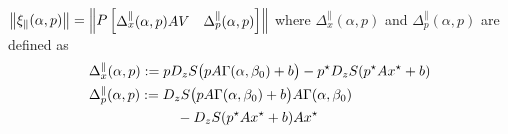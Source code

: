 \documentclass[letterpaper, 10 pt, conference]{ieeeconf}
\begin{document}
\begin{lemma}\label{lem:firing-xi_para}
    \(\left\lVert{\ensuremath{\xi_{\parallel}(\alpha,p)}}\right\rVert = \left\lVert{P \begin{bmatrix} \Delta^{\parallel}_{x}(\alpha,p) AV & \Delta^{\parallel}_{p}(\alpha,p) \end{bmatrix}}\right\rVert\) where \(\Delta^{\parallel}_{x}(\alpha,p)\) and \(\Delta^{\parallel}_{p}(\alpha,p)\) are defined as
    \vspace{-1mm}\begin{subequations} \label{eq:firing-delta_para}
        \begin{align}
             & \Delta^{\parallel}_{x}(\alpha,p) := p D_{z}S\bigl(p A \Gamma(\alpha,\beta_0) + b\bigr) - p^{\star}D_{z}S(p^{\star} A x^{\star} + b) \\
             & \Delta^{\parallel}_{p}(\alpha,p) := D_{z}S\bigl(p A \Gamma(\alpha,\beta_0) + b\bigr)A\Gamma(\alpha,\beta_0) \notag                  \\
             & \hspace{22mm} - D_{z}S(p^{\star} A x^{\star} + b) A x^{\star}
        \end{align}
        \vspace{-5mm}\end{subequations}
\end{lemma}
\end{document}
